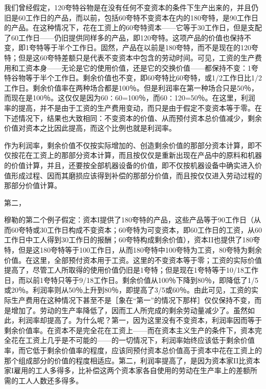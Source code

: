 我们曾经假定，120夸特谷物是在没有任何不变资本的条件下生产出来的，并且仍旧是60工作日的产品，而以前，包括60夸特不变资本在内的180夸特，是90工作日的产品。在这种情况下，花在工资上的60夸特资本——它等于30工作日，但是支配了60工作日——仍旧提供同样多的产品，即120夸特。这项产品的价值也保持不变，即1夸特等于半个工作日。固然，产品在以前是180夸特，而不是现在的120夸特；但是这60夸特差额只是代表不变资本中包含的劳动时间。可见，工资的生产费用和工资本身——无论是它的使用价值，还是它的交换价值——都保持不变：1夸特谷物等于半个工作日。剩余价值也不变，即60夸特比60夸特，或1/2工作日比1/2工作日。剩余价值率在两种场合都是100％。但是利润率在第一种场合只是50％，而现在是100％。这仅仅是因为60∶60=100％，而60∶120=50％。在这里，利润率的提高，并不是由于工资的生产费用变动，而只是由于假定不变资本等于零。在下述情况下，结果也大致相同：不变资本的价值、从而预付资本总价值减少，剩余价值对资本之比因此提高，而这个比例也就是利润率。

作为利润率，剩余价值不仅按实际增加的、创造剩余价值的那部分资本计算，即不仅按花在工资上的那部分资本计算，而且按仅仅是重新出现在产品中的原料和机器的价值计算，并且，还要按全部机器设备的价值，即不仅按机器设备中确实进入价值形成过程、因而其磨损应该得到补偿的那部分价值，而且按仅仅进入劳动过程的那部分价值计算。

第二，

穆勒的第二个例子假定：资本I提供了180夸特的产品，这些产品等于90工作日（从而60夸特或30工作日构成不变资本；60夸特为可变资本，即60工作日的工资，从60工作日中工人得到30工作日的报酬；60夸特构成剩余价值），资本II也提供了180夸特，但是这180夸特等于100工作日，从而180夸特中100夸特为工资，80夸特为剩余价值。在这里，全部预付资本用于工资。这里的不变资本等于零；工资的实际价值提高了，尽管工人所取得的使用价值仍旧是1夸特；但是现在1夸特等于10/18工作日，而以前1夸特只等于9/18工作日。剩余价值从100％下降到80％，即降低了1/5或20％。利润率则从50％上升到80％，即提高了3/5或60％。由此可见，工资的实际生产费用在这种情况下甚至不是［象在“第一”的情况下那样］仅仅保持不变，而是增加了。劳动的生产率降低了，因而工人所完成的剩余劳动量减少了。虽然如此，利润率却提高了。为什么呢？第一，因为这里没有不变资本，利润率因而等于剩余价值率。在资本不是完全花在工资上——而在资本主义生产的条件下，资本完全花在工资上几乎是不可能的——的一切情况下，利润率始终应该低于剩余价值率，而它低于剩余价值率的程度，应该同预付资本总价值高于资本中花在工资上的那个组成部分的价值的程度相适应。第二，利润率提高了，是因为资本家II比资本家I雇用的工人多得多，比补偿这两个资本家各自使用的劳动在生产率上的差额所需的工人人数还多得多。

